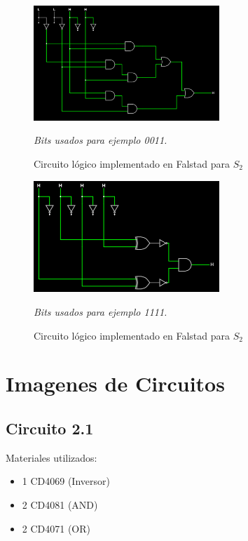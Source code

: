 \begin{figure}[h!]
    \centering
    \includegraphics[width=7cm]{imagenes/2.2_S1.png}
    \caption{Circuito lógico implementado en Falstad para $S_2$}
    \label{fig:falstad_s2}
    \footnotesize\textit{Bits usados para ejemplo 0011.}
\end{figure}


\begin{figure}[h!]
    \centering
    \includegraphics[width=7cm]{imagenes/2.2_S2.png}
    \caption{Circuito lógico implementado en Falstad para $S_2$}
    \label{fig:falstad_s2}
    \footnotesize\textit{Bits usados para ejemplo 1111.}
\end{figure}


\section{Imagenes de Circuitos}


\subsection{Circuito 2.1}

    Materiales utilizados:
    \begin{itemize}
        \item 1 CD4069 (Inversor)
        \item 2 CD4081 (AND)
        \item 2 CD4071 (OR)
        
    \end{itemize}

